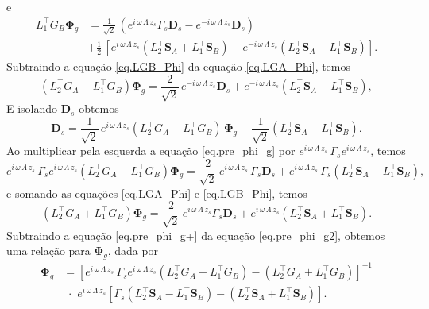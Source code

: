 e
\begin{align}\label{eq.LGB_Phi}
L_1^\top G_B\mathbf{\Phi}_g&=\frac{1}{\sqrt{2}}\,(e^{i\,\omega\,\Lambda\,z_s}\Gamma_s\mathbf{D}_s-e^{-i\,\omega\,\Lambda\,z_s}\mathbf{D}_s)\\\nonumber
&+\frac{1}{2}\,\left[e^{i\,\omega\,\Lambda\,z_s}(L_2^\top\mathbf{S}_A+L_1^\top\mathbf{S}_B)-e^{-i\,\omega\,\Lambda\,z_s}(L_2^\top\mathbf{S}_A-L_1^\top\mathbf{S}_B)\right].
\end{align}
Subtraindo a equa\c{c}\~ao \ref{eq.LGB_Phi} da equa\c{c}\~ao \ref{eq.LGA_Phi}, temos
\begin{equation}\label{eq.pre_phi_g}
(L_2^{\top}G_A-L_1^\top G_B)\mathbf{\Phi}_g=\frac{2}{\sqrt{2}}\,e^{-i\,\omega\,\Lambda\,z_s}\mathbf{D}_s+e^{-i\,\omega\,\Lambda\,z_s}(L_2^\top\mathbf{S}_A-L_1^\top\mathbf{S}_B),
\end{equation}
E isolando $\mathbf{D}_s$ obtemos
\begin{equation*}
\mathbf{D}_s=\frac{1}{\sqrt{2}}\,e^{i\,\omega\,\Lambda\,z_s}(L_2^{\top}G_A-L_1^\top G_B)\,\mathbf{\Phi}_g-\frac{1}{\sqrt{2}}(L_2^\top\mathbf{S}_A-L_1^\top\mathbf{S}_B).
\end{equation*}
Ao multiplicar pela esquerda a equa\c{c}\~ao \ref{eq.pre_phi_g} por $e^{i\,\omega\,\Lambda\,z_s}\,\Gamma_se^{i\,\omega\,\Lambda\,z_s}$, temos
\begin{equation}\label{eq.pre_phi_g2}
e^{i\,\omega\,\Lambda\,z_s}\,\Gamma_se^{i\,\omega\,\Lambda\,z_s}(L_2^{\top}G_A-L_1^\top G_B)\mathbf{\Phi}_g=\frac{2}{\sqrt{2}}\,e^{i\,\omega\,\Lambda\,z_s}\,\Gamma_s\mathbf{D}_s+e^{i\,\omega\,\Lambda\,z_s}\,\Gamma_s(L_2^\top\mathbf{S}_A-L_1^\top\mathbf{S}_B),
\end{equation}
e somando as equa\c{c}\~oes \ref{eq.LGA_Phi} e \ref{eq.LGB_Phi}, temos
\begin{equation}\label{eq.pre_phi_g+}
(L_2^{\top}G_A+L_1^\top G_B)\mathbf{\Phi}_g=\frac{2}{\sqrt{2}}\,e^{i\,\omega\,\Lambda\,z_s}\Gamma_s\mathbf{D}_s+e^{i\,\omega\,\Lambda\,z_s}(L_2^\top\mathbf{S}_A+L_1^\top\mathbf{S}_B).
\end{equation}
Subtraindo a equa\c{c}\~ao \ref{eq.pre_phi_g+} da equa\c{c}\~ao \ref{eq.pre_phi_g2}, obtemos uma rela\c{c}\~ao para $\mathbf{\Phi}_g$, dada por 
\begin{align*}
\mathbf{\Phi}_g&=\left[e^{i\,\omega\,\Lambda\,z_s}\,\Gamma_se^{i\,\omega\,\Lambda\,z_s}(L_2^{\top}G_A-L_1^\top G_B)-(L_2^{\top}G_A+L_1^\top G_B)\right]^{-1}\\
&\,\,\cdot\,\,e^{i\,\omega\,\Lambda\,z_s}\left[\Gamma_s (L_2^\top\mathbf{S}_A-L_1^\top\mathbf{S}_B)-(L_2^\top\mathbf{S}_A+L_1^\top\mathbf{S}_B)\right].
\end{align*}
